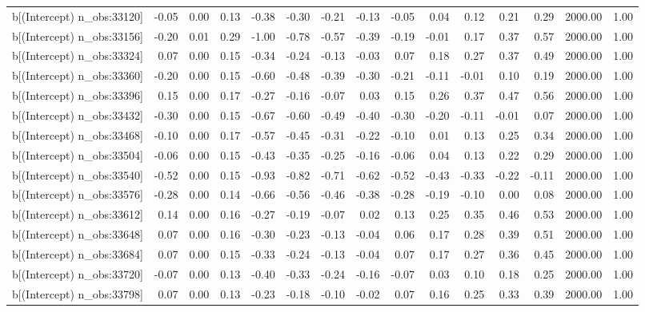 \begin{table}[ht]
\begin{tabular}{rrrrrrrrrrrrrrr}
  b[(Intercept) n\_obs:33120] & -0.05 & 0.00 & 0.13 & -0.38 & -0.30 & -0.21 & -0.13 & -0.05 & 0.04 & 0.12 & 0.21 & 0.29 & 2000.00 & 1.00 \\ 
  b[(Intercept) n\_obs:33156] & -0.20 & 0.01 & 0.29 & -1.00 & -0.78 & -0.57 & -0.39 & -0.19 & -0.01 & 0.17 & 0.37 & 0.57 & 2000.00 & 1.00 \\ 
  b[(Intercept) n\_obs:33324] & 0.07 & 0.00 & 0.15 & -0.34 & -0.24 & -0.13 & -0.03 & 0.07 & 0.18 & 0.27 & 0.37 & 0.49 & 2000.00 & 1.00 \\ 
  b[(Intercept) n\_obs:33360] & -0.20 & 0.00 & 0.15 & -0.60 & -0.48 & -0.39 & -0.30 & -0.21 & -0.11 & -0.01 & 0.10 & 0.19 & 2000.00 & 1.00 \\ 
  b[(Intercept) n\_obs:33396] & 0.15 & 0.00 & 0.17 & -0.27 & -0.16 & -0.07 & 0.03 & 0.15 & 0.26 & 0.37 & 0.47 & 0.56 & 2000.00 & 1.00 \\ 
  b[(Intercept) n\_obs:33432] & -0.30 & 0.00 & 0.15 & -0.67 & -0.60 & -0.49 & -0.40 & -0.30 & -0.20 & -0.11 & -0.01 & 0.07 & 2000.00 & 1.00 \\ 
  b[(Intercept) n\_obs:33468] & -0.10 & 0.00 & 0.17 & -0.57 & -0.45 & -0.31 & -0.22 & -0.10 & 0.01 & 0.13 & 0.25 & 0.34 & 2000.00 & 1.00 \\ 
  b[(Intercept) n\_obs:33504] & -0.06 & 0.00 & 0.15 & -0.43 & -0.35 & -0.25 & -0.16 & -0.06 & 0.04 & 0.13 & 0.22 & 0.29 & 2000.00 & 1.00 \\ 
  b[(Intercept) n\_obs:33540] & -0.52 & 0.00 & 0.15 & -0.93 & -0.82 & -0.71 & -0.62 & -0.52 & -0.43 & -0.33 & -0.22 & -0.11 & 2000.00 & 1.00 \\ 
  b[(Intercept) n\_obs:33576] & -0.28 & 0.00 & 0.14 & -0.66 & -0.56 & -0.46 & -0.38 & -0.28 & -0.19 & -0.10 & 0.00 & 0.08 & 2000.00 & 1.00 \\ 
  b[(Intercept) n\_obs:33612] & 0.14 & 0.00 & 0.16 & -0.27 & -0.19 & -0.07 & 0.02 & 0.13 & 0.25 & 0.35 & 0.46 & 0.53 & 2000.00 & 1.00 \\ 
  b[(Intercept) n\_obs:33648] & 0.07 & 0.00 & 0.16 & -0.30 & -0.23 & -0.13 & -0.04 & 0.06 & 0.17 & 0.28 & 0.39 & 0.51 & 2000.00 & 1.00 \\ 
  b[(Intercept) n\_obs:33684] & 0.07 & 0.00 & 0.15 & -0.33 & -0.24 & -0.13 & -0.04 & 0.07 & 0.17 & 0.27 & 0.36 & 0.45 & 2000.00 & 1.00 \\ 
  b[(Intercept) n\_obs:33720] & -0.07 & 0.00 & 0.13 & -0.40 & -0.33 & -0.24 & -0.16 & -0.07 & 0.03 & 0.10 & 0.18 & 0.25 & 2000.00 & 1.00 \\ 
  b[(Intercept) n\_obs:33798] & 0.07 & 0.00 & 0.13 & -0.23 & -0.18 & -0.10 & -0.02 & 0.07 & 0.16 & 0.25 & 0.33 & 0.39 & 2000.00 & 1.00 \\ 

\end{tabular}
\end{table}
